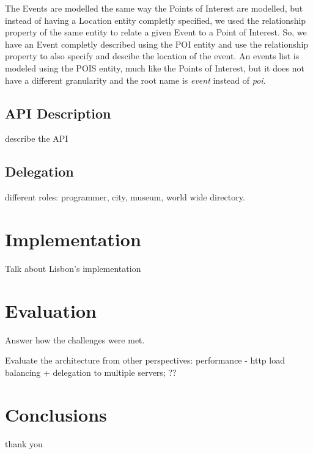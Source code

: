 \documentclass[times]{ettauth}
\begin{document}
The Events are modelled the same way the Points of Interest are modelled, but instead of having a Location entity completly specified, we used the relationship property of the same entity to relate a given Event to a Point of Interest. So, we have an Event completly described using the POI entity and use the relationship property to also specify and descibe the location of the event. An events list is modeled using the POIS entity, much like the Points of Interest, but it does not have a different granularity and the root name is \textit{event} instead of \textit{poi}.

\subsection{API Description}
describe the API

\subsection{Delegation}
different roles: programmer, city, museum, world wide directory.


\section{Implementation}
Talk about Lisbon's implementation



\section{Evaluation}
Answer how the challenges were met.

Evaluate the architecture from other perspectives: performance - http load balancing + delegation to multiple servers; ??



\section{Conclusions}


\acks
thank you



\end{document}
